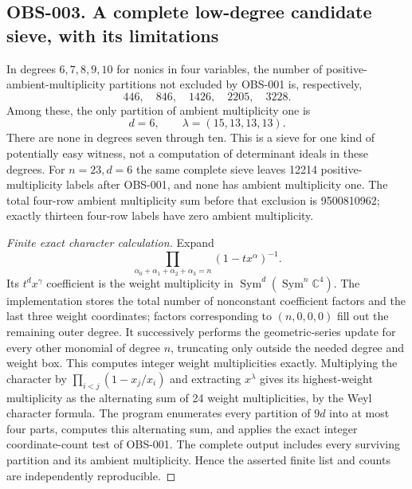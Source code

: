 \subsection{OBS-003. A complete low-degree candidate sieve, with its limitations}
In degrees $6,7,8,9,10$ for nonics in four variables, the number of
positive-ambient-multiplicity partitions not excluded by OBS-001 is,
respectively,
\[
                 446,\quad846,\quad1426,\quad2205,\quad3228.
\]
Among these, the only partition of ambient multiplicity one is
\[
                   d=6,\qquad\lambda=(15,13,13,13).
\]
There are none in degrees seven through ten. This is a sieve for one
kind of potentially easy witness, not a computation of determinant
ideals in these degrees.
For $n=23,d=6$ the same complete sieve leaves 12214 positive-multiplicity
labels after OBS-001, and none has ambient multiplicity one. The total
four-row ambient multiplicity sum before that exclusion is 9500810962;
exactly thirteen four-row labels have zero ambient multiplicity.

\begin{proof}[Finite exact character calculation]
Expand
\[
 \prod_{\alpha_0+\alpha_1+\alpha_2+\alpha_3=n}
       (1-tx^\alpha)^{-1}.
\]
Its $t^d x^\gamma$ coefficient is the weight multiplicity in
$\operatorname{Sym}^d(\operatorname{Sym}^n\mathbb C^4)$.
The implementation stores the total number of nonconstant coefficient
factors and the last three weight coordinates; factors corresponding
to $(n,0,0,0)$ fill out the remaining outer degree. It successively
performs the geometric-series update for every other monomial of degree
$n$, truncating only outside the needed degree and weight box. This
computes integer weight multiplicities exactly. Multiplying the
character by $\prod_{i<j}(1-x_j/x_i)$ and extracting $x^\lambda$
gives its highest-weight multiplicity as the alternating sum of 24
weight multiplicities, by the Weyl character formula. The program
enumerates every partition of $9d$ into at most four parts, computes
this alternating sum, and applies the exact integer coordinate-count
test of OBS-001. The complete output includes every surviving partition
and its ambient multiplicity. Hence the asserted finite list and counts
are independently reproducible.
\end{proof}

